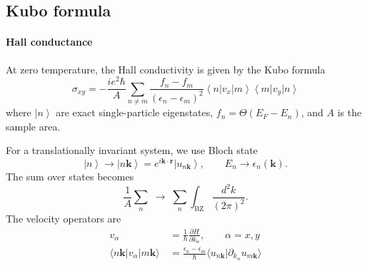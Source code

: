 \documentclass[12pt,a4paper]{article}
\newcommand{\bra}[1]{\left\langle{#1}\right|}
\newcommand{\ket}[1]{\left|{#1}\right\rangle}
\newcommand{\braket}[2]{\langle{#1}|{#2}\rangle}
\begin{document}
\subsection{Kubo formula}

\paragraph{Hall conductance}

    At zero temperature, the Hall conductivity is given by the Kubo formula
    \begin{equation}
    \label{eq:Kubo}
        \sigma_{xy}
        = -\frac{ie^2\hbar}{A} \sum_{n\neq m}
        \frac{f_n-f_m}{(\epsilon_n-\epsilon_m)^2}
        \bra{n} v_x \ket{m} \bra{m} v_y \ket{n}
    \end{equation}
    where $\ket{n}$ are exact single-particle eigenstates,
    $f_n=\Theta(E_F-E_n)$, and $A$ is the sample area.

    For a translationally invariant system, we use Bloch state
    \[
        \ket{n} \to \ket{n\mathbf{k}}
        =
        e^{i\mathbf{k}\cdot\mathbf{r}} \ket{u_{n\mathbf{k}}},
        \qquad
        E_n \to \epsilon_n(\mathbf{k}).
    \]
    The sum over states becomes
    \[
        \frac{1}{A}\sum_n \;\to\;
        \sum_n \int_{\mathrm{BZ}}\frac{d^2k}{(2\pi)^2}.
    \]
    The velocity operators are
    \[\begin{aligned}
        v_\alpha
        &\, = \frac{1}{\hbar} \frac{\partial H}{\partial k_\alpha},
        \qquad \alpha = x,y \\
        \langle n\mathbf{k}|v_\alpha|m\mathbf{k}\rangle
        &\, = \frac{\epsilon_n-\epsilon_m}{\hbar}
        \braket{u_{n\mathbf{k}}}{\partial_{k_\alpha}u_{m\mathbf{k}}}
    \end{aligned}\]
\end{document}

